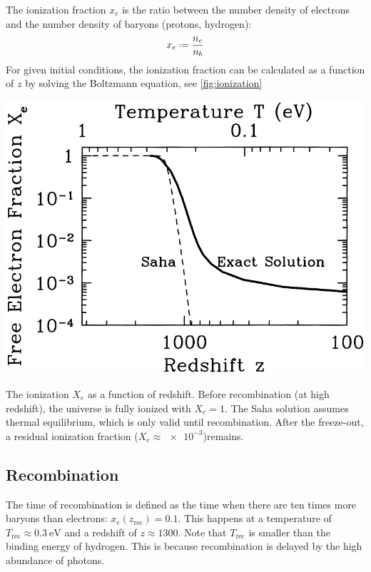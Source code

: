 The ionization fraction $x_e$ is the ratio between the number density of electrons and the number density of baryons (protons, hydrogen):
\begin{align*}
	x_e \defeq \frac{n_e}{n_b}
\end{align*}
For given initial conditions, the ionization fraction can be calculated as a function of $z$ by solving the Boltzmann equation, see \cref{fig:ionization}

\begin{marginfigure}
	\centering
	\includegraphics[width=\textwidth]{img/ch-02/ionization.png}
	\caption{The ionization $X_e$ as a function of redshift. Before recombination (at high redshift), the universe is fully ionized with $X_e=1$. The Saha solution assumes thermal equilibrium, which is only valid until recombination. After the freeze-out, a residual ionization fraction ($X_e \approx \num{e-3}$)remains.}
	\label{fig:ionization}
\end{marginfigure}

\subsection{Recombination}

The time of recombination is defined as the time when there are ten times more baryons than electrons: $x_e(z_\text{rec}) = 0.1$. This happens at a temperature of $T_\text{rec} \approx \SI{0.3}{\eV}$ and a redshift of $z \approx 1300$. Note that $T_\text{rec}$ is smaller than the binding energy of hydrogen. This is because recombination is delayed by the high abundance of photons.

